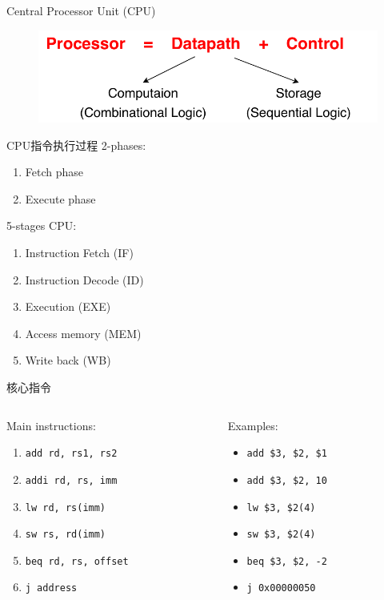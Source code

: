\documentclass{myslide}
\begin{document}
\begin{frame}{Central Processor Unit (CPU)}
\begin{figure}
\centering
\includegraphics[width=0.8\linewidth]{fig/Lecture2/Abstraction-Processor.pdf}
\end{figure}
\end{frame}

\begin{frame}{CPU指令执行过程}
2-phases:
\begin{enumerate}
	\item Fetch phase
	\item Execute phase
\end{enumerate}
5-stages CPU:
\begin{enumerate}
	\item Instruction Fetch (IF)
	\item Instruction Decode (ID)
	\item Execution (EXE)
	\item Access memory (MEM)
	\item Write back (WB)
\end{enumerate}
\end{frame}

\begin{frame}[fragile]{核心指令}
\begin{columns}
\begin{column}{0.5\linewidth}
Main instructions:
\begin{enumerate}
	\item \verb'add rd, rs1, rs2'
	\item \verb'addi rd, rs, imm'
	\item \verb'lw rd, rs(imm)'
	\item \verb'sw rs, rd(imm)'
	\item \verb'beq rd, rs, offset'
	\item \verb'j address'
\end{enumerate}
\end{column}
\begin{column}{0.5\linewidth}
Examples:
\begin{itemize}
	\item \verb'add $3, $2, $1'
	\item \verb'add $3, $2, 10'
	\item \verb'lw $3, $2(4)'
	\item \verb'sw $3, $2(4)'
	\item \verb'beq $3, $2, -2'
	\item \verb'j 0x00000050'
\end{itemize}
\end{column}
\end{columns}
\end{frame}
\end{document}
